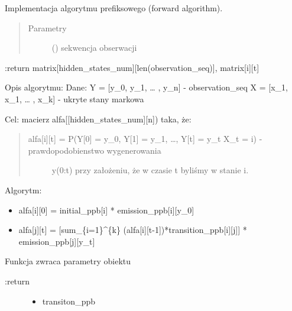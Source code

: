 \documentclass[letterpaper,10pt,polish]{sphinxmanual}
\begin{document}
\begin{fulllineitems}

\begin{fulllineitems}
\label{\detokenize{HMM:HMM.HMM.forward_algorithm}}
Implementacja algorytmu prefiksowego (forward algorithm).
\begin{quote}\begin{description}
\item[{Parametry}] \leavevmode
{} () \textendash{} sekwencja obserwacji

\end{description}\end{quote}

:return matrix{[}hidden\_states\_num{]}{[}len(observation\_seq){]}, matrix{[}i{]}{[}t{]}

Opis algorytmu:
Dane:
Y = {[}y\_0, y\_1, … , y\_n{]} - observation\_seq
X = {[}x\_1, x\_1, … , x\_k{]} - ukryte stany markowa

Cel:
macierz alfa{[}{[}hidden\_states\_num{]}{[}n{]}) taka, że:
\begin{quote}
\begin{description}
\item[{alfa{[}i{]}{[}t{]} = P(Y{[}0{]} = y\_0, Y{[}1{]} = y\_1, …, Y{[}t{]} = y\_t \textbar{} X\_t = i) - prawdopodobienstwo wygenerowania}] \leavevmode
y(0:t) przy założeniu, że w czasie t byliśmy w stanie i.

\end{description}
\end{quote}

Algorytm:
\begin{itemize}
\item {} 
alfa{[}i{]}{[}0{]} = initial\_ppb{[}i{]} * emission\_ppb{[}i{]}{[}y\_0{]}

\item {} 
alfa{[}j{]}{[}t{]} = {[}sum\_\{i=1\}\textasciicircum{}\{k\} (alfa{[}i{]}{[}t-1{]})*transition\_ppb{[}i{]}{[}j{]}{]} * emission\_ppb{[}j{]}{[}y\_t{]}

\end{itemize}

\end{fulllineitems}


\begin{fulllineitems}
\label{\detokenize{HMM:HMM.HMM.get_parameters}}
Funkcja zwraca parametry obiektu
\begin{description}
\item[{:return}] \leavevmode\begin{itemize}
\item {} 
transiton\_ppb


\end{itemize}
\end{description}
\end{fulllineitems}
\end{fulllineitems}
\end{document}
